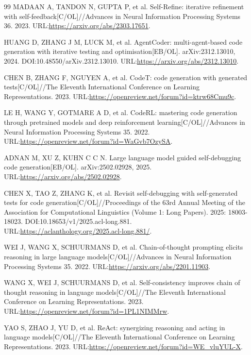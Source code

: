 \begin{thebibliography}{99}
MADAAN A, TANDON N, GUPTA P, et al.
Self-Refine: iterative refinement with self-feedback[C/OL]//Advances in Neural Information Processing Systems 36.
2023.
URL:\url{https://arxiv.org/abs/2303.17651}.

HUANG D, ZHANG J M, LUCK M, et al.
AgentCoder: multi-agent-based code generation with iterative testing and optimisation[EB/OL].
arXiv:2312.13010, 2024.
DOI:10.48550/arXiv.2312.13010.
URL:\url{https://arxiv.org/abs/2312.13010}.

CHEN B, ZHANG F, NGUYEN A, et al.
CodeT: code generation with generated tests[C/OL]//The Eleventh International Conference on Learning Representations.
2023.
URL:\url{https://openreview.net/forum?id=ktrw68Cmu9c}.

LE H, WANG Y, GOTMARE A D, et al.
CodeRL: mastering code generation through pretrained models and deep reinforcement learning[C/OL]//Advances in Neural Information Processing Systems 35.
2022.
URL:\url{https://openreview.net/forum?id=WaGvb7OzySA}.

ADNAN M, XU Z, KUHN C C N.
Large language model guided self-debugging code generation[EB/OL].
arXiv:2502.02928, 2025.
URL:\url{https://arxiv.org/abs/2502.02928}.

CHEN X, TAO Z, ZHANG K, et al.
Revisit self-debugging with self-generated tests for code generation[C/OL]//Proceedings of the 63rd Annual Meeting of the Association for Computational Linguistics (Volume 1: Long Papers).
2025: 18003-18023.
DOI:10.18653/v1/2025.acl-long.881.
URL:\url{https://aclanthology.org/2025.acl-long.881/}.

WEI J, WANG X, SCHUURMANS D, et al.
Chain-of-thought prompting elicits reasoning in large language models[C/OL]//Advances in Neural Information Processing Systems 35.
2022.
URL:\url{https://arxiv.org/abs/2201.11903}.

WANG X, WEI J, SCHUURMANS D, et al.
Self-consistency improves chain of thought reasoning in language models[C/OL]//The Eleventh International Conference on Learning Representations.
2023.
URL:\url{https://openreview.net/forum?id=1PL1NIMMrw}.

YAO S, ZHAO J, YU D, et al.
ReAct: synergizing reasoning and acting in language models[C/OL]//The Eleventh International Conference on Learning Representations.
2023.
URL:\url{https://openreview.net/forum?id=WE_vluYUL-X}.


\end{thebibliography}
